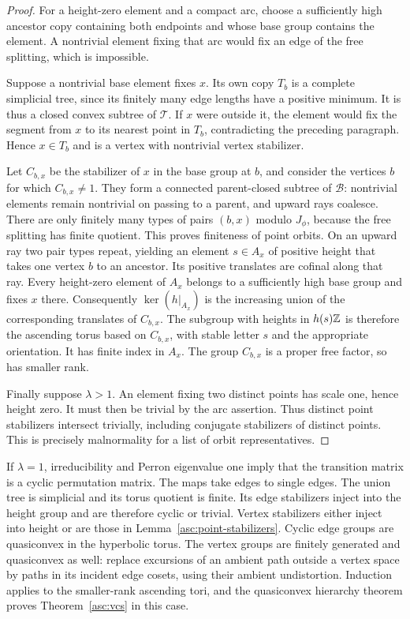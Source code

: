 \begin{proof}
For a height-zero element and a compact arc, choose a sufficiently high
ancestor copy containing both endpoints and whose base group contains
the element. A nontrivial element fixing that arc would fix an edge of
the free splitting, which is impossible.

Suppose a nontrivial base element fixes $x$. Its own copy $T_b$ is a
complete simplicial tree, since its finitely many edge lengths have a
positive minimum. It is thus a closed convex subtree of $\mathcal T$.
If $x$ were outside it, the element would fix the segment from $x$ to
its nearest point in $T_b$, contradicting the preceding paragraph.
Hence $x\in T_b$ and is a vertex with nontrivial vertex stabilizer.

Let $C_{b,x}$ be the stabilizer of $x$ in the base group at $b$, and
consider the vertices $b$ for which $C_{b,x}\ne1$. They form a connected
parent-closed subtree of $\mathcal B$: nontrivial elements remain
nontrivial on passing to a parent, and upward rays coalesce. There are
only finitely many types of pairs $(b,x)$ modulo $J_\phi$, because the
free splitting has finite quotient. This proves finiteness of point
orbits. On an upward ray two pair types repeat, yielding an element
$s\in A_x$ of positive height that takes one vertex $b$ to an ancestor.
Its positive translates are cofinal along that ray. Every height-zero
element of $A_x$ belongs to a sufficiently high base group and fixes
$x$ there. Consequently $\ker(h|_{A_x})$ is the increasing union of the
corresponding translates of $C_{b,x}$. The subgroup with heights in
$h(s)\mathbb Z$ is therefore the ascending torus based on $C_{b,x}$, with stable
letter $s$ and the appropriate orientation. It has finite index in
$A_x$. The group $C_{b,x}$ is a proper free factor, so has smaller rank.

Finally suppose $\lambda>1$. An element fixing two distinct points has
scale one, hence height zero. It must then be trivial by the arc
assertion. Thus distinct point stabilizers intersect trivially, including
conjugate stabilizers of distinct points. This is precisely malnormality
for a list of orbit representatives.
\end{proof}

If $\lambda=1$, irreducibility and Perron eigenvalue one imply that the
transition matrix is a cyclic permutation matrix. The maps take edges
to single edges. The union tree is simplicial and its torus quotient is
finite. Its edge stabilizers inject into the height group and are
therefore cyclic or trivial. Vertex stabilizers either inject into
height or are those in Lemma~\ref{asc:point-stabilizers}. Cyclic edge
groups are quasiconvex in the hyperbolic torus. The vertex groups are
finitely generated and quasiconvex as well: replace excursions of an
ambient path outside a vertex space by paths in its incident edge
cosets, using their ambient undistortion. Induction applies to the
smaller-rank ascending tori, and the quasiconvex hierarchy theorem
\cite{Wise2021} proves Theorem~\ref{asc:vcs} in this case.

